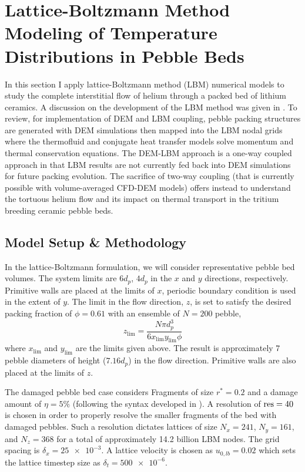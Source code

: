 \section{Lattice-Boltzmann Method Modeling of Temperature Distributions in Pebble Beds}\label{sec:lbm-studies}
In this section I apply lattice-Boltzmann method (LBM) numerical models to study the complete interstitial flow of helium through a packed bed of lithium ceramics. A discussion on the development of the LBM method was given in . To review, for implementation of DEM and LBM coupling, pebble packing structures are generated with DEM simulations then mapped into the LBM nodal grids where the thermofluid and conjugate heat transfer models solve momentum and thermal conservation equations. The DEM-LBM approach is a one-way coupled approach in that LBM results are not currently fed back into DEM simulations for future packing evolution. The sacrifice of two-way coupling (that is currently possible with volume-averaged CFD-DEM models) offers instead to understand the tortuous helium flow and its impact on thermal transport in the tritium breeding ceramic pebble beds.





\subsection{Model Setup \& Methodology}
In the lattice-Boltzmann formulation, we will consider representative pebble bed volumes. The system limits are $6d_p$, $4d_p$ in the $x$ and $y$ directions, respectively. Primitive walls are placed at the limits of $x$, periodic boundary condition is used in the extent of $y$. The limit in the flow direction, $z$, is set to satisfy the desired packing fraction of $\phi = 0.61$ with an ensemble of $N = 200$ pebble,
\begin{equation}
z_\text{lim} = \frac{N\pi d_p^3}{6x_\text{lim}y_\text{lim}\phi}
\end{equation}
where $x_\text{lim}$ and $y_\text{lim}$ are the limits given above. The result is approximately 7 pebble diameters of height ($7.16 d_p$) in the flow direction. Primitive walls are also placed at the limits of $z$.

The damaged pebble bed case considers Fragments of size $r^* = 0.2$ and a damage amount of $\eta = 5\%$ (following the syntax developed in ). A resolution of $\text{res} = 40$ is chosen in order to properly resolve the smaller fragments of the bed with damaged pebbles. Such a resolution dictates lattices of size $N_x = 241$, $N_y = 161$, and $N_z = 368$ for a total of approximately 14.2 billion LBM nodes. The grid spacing is $\delta_x = \num{25e-3}$. A lattice velocity is chosen as $u_{0,lb} = 0.02$ which sets the lattice timestep size as $\delta_t = \num{500e-6}$. 

